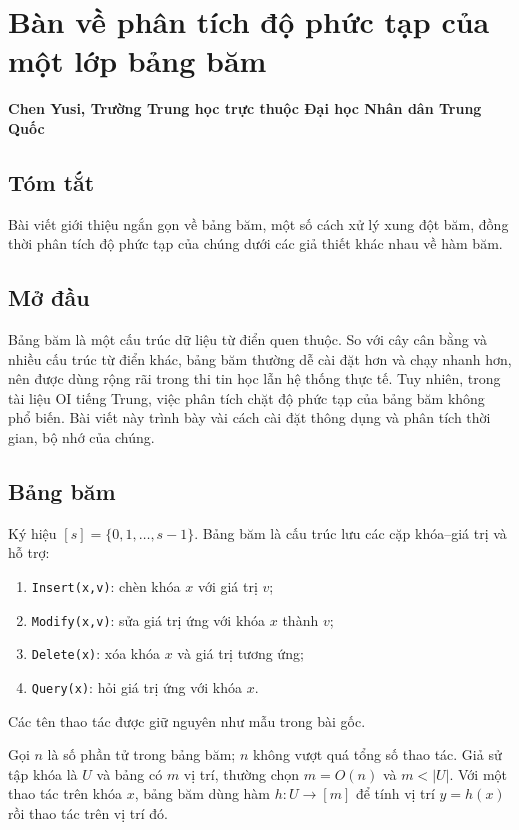 \documentclass[11pt]{article}
\begin{document}
\section{Bàn về phân tích độ phức tạp của một lớp bảng băm}

\begin{center}
\textbf{Chen Yusi, Trường Trung học trực thuộc Đại học Nhân dân Trung Quốc}
\end{center}

\subsection*{Tóm tắt}

Bài viết giới thiệu ngắn gọn về bảng băm, một số cách xử lý xung đột băm, đồng
thời phân tích độ phức tạp của chúng dưới các giả thiết khác nhau về hàm băm.

\subsection{Mở đầu}

Bảng băm là một cấu trúc dữ liệu từ điển quen thuộc. So với cây cân bằng và
nhiều cấu trúc từ điển khác, bảng băm thường dễ cài đặt hơn và chạy nhanh hơn,
nên được dùng rộng rãi trong thi tin học lẫn hệ thống thực tế. Tuy nhiên, trong
tài liệu OI tiếng Trung, việc phân tích chặt độ phức tạp của bảng băm không phổ
biến. Bài viết này trình bày vài cách cài đặt thông dụng và phân tích thời gian,
bộ nhớ của chúng.

\subsection{Bảng băm}

Ký hiệu $[s]=\{0,1,\ldots,s-1\}$. Bảng băm là cấu trúc lưu các cặp khóa--giá trị
và hỗ trợ:
\begin{enumerate}
  \item \texttt{Insert(x,v)}: chèn khóa $x$ với giá trị $v$;
  \item \texttt{Modify(x,v)}: sửa giá trị ứng với khóa $x$ thành $v$;
  \item \texttt{Delete(x)}: xóa khóa $x$ và giá trị tương ứng;
  \item \texttt{Query(x)}: hỏi giá trị ứng với khóa $x$.
\end{enumerate}
Các tên thao tác được giữ nguyên như mẫu trong bài gốc.

Gọi $n$ là số phần tử trong bảng băm; $n$ không vượt quá tổng số thao tác. Giả
sử tập khóa là $U$ và bảng có $m$ vị trí, thường chọn $m=O(n)$ và $m<|U|$. Với
một thao tác trên khóa $x$, bảng băm dùng hàm $h:U\to[m]$ để tính vị trí
$y=h(x)$ rồi thao tác trên vị trí đó.
\end{document}

